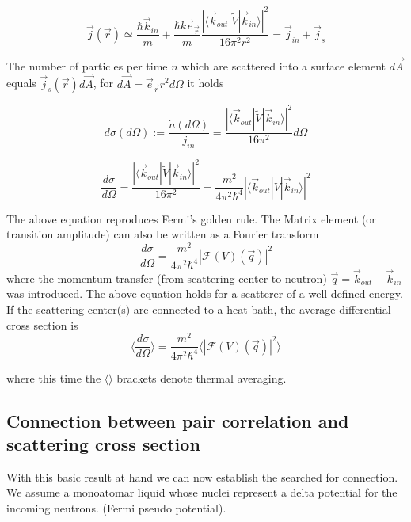 \documentclass[11pt,a4paper]{article}
\begin{document}
\begin{equation}
\vec j (\vec r) \simeq \frac{\hbar \vec k_{in} }{m} +  \frac{\hbar k \vec e_{\vec r} }{m} 
\frac{|\langle \vec k_{out} | \tilde V | \vec k_{in} \rangle|^2}{16 \pi^2 r^ 2}
= \vec j_{in} + \vec j_s
\end{equation}

The number of particles per time $\dot n$ which are scattered into a surface element $d\vec A$ 
equals $\vec j_s (\vec r)  d \vec A$, for $d \vec A =  \vec e_{\vec r} r^2 d\Omega$ it holds

\begin{equation}
d \sigma (d \Omega) := \frac{\dot n(d\Omega)}{j_{in}} =  \frac{|\langle \vec k_{out} | \tilde V | \vec k_{in} \rangle|^2}{16 \pi^2} d\Omega
\end{equation}

\begin{equation}
\frac{d \sigma} {d\Omega} = \frac{|\langle \vec k_{out} | \tilde V | \vec k_{in} \rangle|^2}{16 \pi^2} =
\frac{m^2}{4 \pi^2 \hbar^4} |\langle \vec k_{out} |  V | \vec k_{in} \rangle|^2
\end{equation}

The above equation reproduces Fermi's golden rule. The Matrix element (or transition amplitude) can also be written as a Fourier transform
\begin{equation}
\frac{d \sigma} {d\Omega} = 
\frac{m^2}{4 \pi^2 \hbar^4} |\mathcal{F} (V) (\vec q)|^2
\end{equation}
where the momentum transfer (from scattering center to neutron) $\vec q = \vec k_{out} - \vec k_{in}$ was introduced. \newline
The above equation holds for a scatterer of a well defined energy. If the scattering center(s) are connected to a heat bath, the average
differential cross section is
\begin{equation}
\langle \frac{d \sigma} {d\Omega} \rangle= 
\frac{m^2}{4 \pi^2 \hbar^4} \langle |\mathcal{F} (V) (\vec q)|^2 \rangle
\end{equation}

where this time the $\langle  \rangle$ brackets denote thermal averaging.
\subsection{Connection between pair correlation and scattering cross section}
With this basic result at hand we can now establish the searched for connection. We assume a monoatomar liquid whose nuclei
represent a delta potential for the incoming neutrons. (Fermi pseudo potential).
\end{document}

